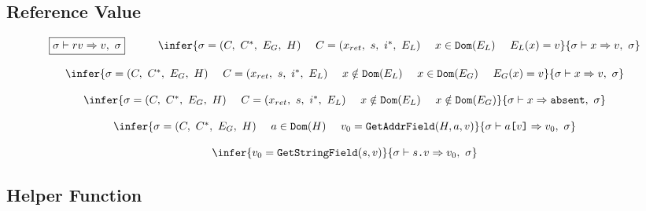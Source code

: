 \subsection{Reference Value}\label{sec:refer-val}
\[
\begin{array}{c}
\multicolumn{1}{c}{\begin{array}{ccc}
\fbox{$\evalrefv{\st}{\symrefv}{v}{\st}$}
& \cs &
\infer
{\st = \symstatetuple{\symctx}{\symctxstack}{\symenv_G}{\symheap} \ \ \ \
\symctx = \symctxtuple{x_{ret}}{s}{i^*}{\symenv_L}\ \ \ \
x \in \code{Dom}(\symenv_L)\ \ \ \
\symenv_L (x) = v }
{\evalrefv{\st}{x}{v}{\st}}
\end{array}}
\\ \\
\infer
{\st = \symstatetuple{\symctx}{\symctxstack}{\symenv_G}{\symheap} \ \ \ \
\symctx = \symctxtuple{x_{ret}}{s}{i^*}{\symenv_L}\ \ \ \
x \notin \code{Dom}(\symenv_L)\ \ \ \
x \in \code{Dom}(\symenv_G)\ \ \ \
\symenv_G (x) = v }
{\evalrefv{\st}{x}{v}{\st}}
\\ \\
\infer
{\st = \symstatetuple{\symctx}{\symctxstack}{\symenv_G}{\symheap} \ \ \ \
\symctx = \symctxtuple{x_{ret}}{s}{i^*}{\symenv_L}\ \ \ \
x \notin \code{Dom}(\symenv_L)\ \ \ \
x \notin \code{Dom}(\symenv_G)}
{\evalrefv{\st}{x}{\code{absent}}{\st}}
\\ \\
\infer
{\st = \symstatetuple{\symctx}{\symctxstack}{\symenv_G}{\symheap} \ \ \ \
a \in \code{Dom}(\symheap)\ \ \ \
\hgetaddrfield{\symheap}{a}{v}{v_0}}
{\evalrefv{\st}{a\code{[} v \code{]}}{v_0}{\st}}
\\ \\
\infer
{\hgetstrfield{s}{v}{v_0}}
{\evalrefv{\st}{s\code{.}v}{v_0}{\st}}

\end{array}
\]

\newpage

\subsection{Helper Function}\label{sec:helper}

